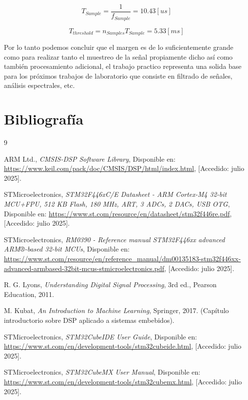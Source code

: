 \documentclass[12pt]{article}
\begin{document}
	\begin{equation}
		T_{Sample} = \frac{1}{f_{Sample}} = 10.43 [us]
	\end{equation}
	
	\begin{equation}
		T_{threshold} = n_{Samples} T_{Sample} = 5.33[ms]
	\end{equation}
	
	Por lo tanto podemos concluir que el margen es de lo suficientemente grande como para realizar tanto el muestreo de la señal propiamente dicho así como también procesamiento adicional, el trabajo practico representa una solida base para los próximos trabajos de laboratorio que consiste en filtrado de señales, análisis espectrales, etc.
	
	\section{Bibliografía}
	
	\begin{thebibliography}{9}
		
		ARM Ltd.,
		\textit{CMSIS-DSP Software Library},
		Disponible en: \url{https://www.keil.com/pack/doc/CMSIS/DSP/html/index.html},
		[Accedido: julio 2025].
		
		STMicroelectronics,
		\textit{STM32F446xC/E Datasheet - ARM Cortex-M4 32-bit MCU+FPU, 512 KB Flash, 180 MHz, ART, 3 ADCs, 2 DACs, USB OTG},
		Disponible en: \url{https://www.st.com/resource/en/datasheet/stm32f446re.pdf},
		[Accedido: julio 2025].
		
		STMicroelectronics,
		\textit{RM0390 - Reference manual STM32F446xx advanced ARM®-based 32-bit MCUs},
		Disponible en: \url{https://www.st.com/resource/en/reference_manual/dm00135183-stm32f446xx-advanced-armbased-32bit-mcus-stmicroelectronics.pdf},
		[Accedido: julio 2025].
		
		R. G. Lyons,
		\textit{Understanding Digital Signal Processing},
		3rd ed., Pearson Education, 2011.
		
		M. Kubat,
		\textit{An Introduction to Machine Learning},
		Springer, 2017. (Capítulo introductorio sobre DSP aplicado a sistemas embebidos).
		
		STMicroelectronics,
		\textit{STM32CubeIDE User Guide},
		Disponible en: \url{https://www.st.com/en/development-tools/stm32cubeide.html},
		[Accedido: julio 2025].
		
		STMicroelectronics,
		\textit{STM32CubeMX User Manual},
		Disponible en: \url{https://www.st.com/en/development-tools/stm32cubemx.html},
		[Accedido: julio 2025].
		
	\end{thebibliography}
	
	
\end{document}
